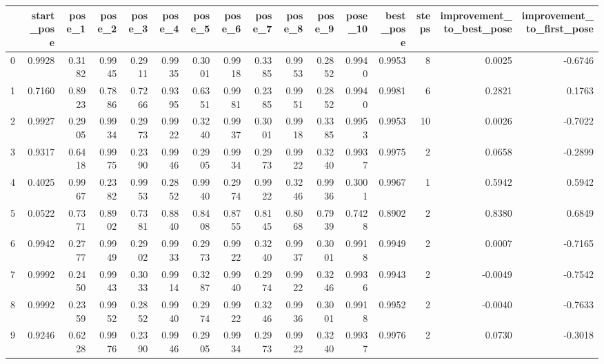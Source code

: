 \begin{tabular}{lrrrrrrrrrrrrrrr}
\toprule
{} &  start\_pose &  pose\_1 &  pose\_2 &  pose\_3 &  pose\_4 &  pose\_5 &  pose\_6 &  pose\_7 &  pose\_8 &  pose\_9 &  pose\_10 &  best\_pose &  steps &  improvement\_to\_best\_pose &  improvement\_to\_first\_pose \\
\midrule
0   &      0.9928 &  0.3182 &  0.9945 &  0.2911 &  0.9935 &  0.3001 &  0.9918 &  0.3385 &  0.9953 &  0.2852 &   0.9940 &     0.9953 &      8 &                    0.0025 &                    -0.6746 \\
1   &      0.7160 &  0.8923 &  0.7886 &  0.7266 &  0.9395 &  0.6351 &  0.9981 &  0.2385 &  0.9951 &  0.2852 &   0.9940 &     0.9981 &      6 &                    0.2821 &                     0.1763 \\
2   &      0.9927 &  0.2905 &  0.9934 &  0.2973 &  0.9922 &  0.3240 &  0.9937 &  0.3001 &  0.9918 &  0.3385 &   0.9953 &     0.9953 &     10 &                    0.0026 &                    -0.7022 \\
3   &      0.9317 &  0.6418 &  0.9975 &  0.2390 &  0.9946 &  0.2905 &  0.9934 &  0.2973 &  0.9922 &  0.3240 &   0.9937 &     0.9975 &      2 &                    0.0658 &                    -0.2899 \\
4   &      0.4025 &  0.9967 &  0.2382 &  0.9953 &  0.2852 &  0.9940 &  0.2974 &  0.9922 &  0.3246 &  0.9936 &   0.3001 &     0.9967 &      1 &                    0.5942 &                     0.5942 \\
5   &      0.0522 &  0.7371 &  0.8902 &  0.7381 &  0.8840 &  0.8408 &  0.8755 &  0.8145 &  0.8068 &  0.7939 &   0.7428 &     0.8902 &      2 &                    0.8380 &                     0.6849 \\
6   &      0.9942 &  0.2777 &  0.9949 &  0.2902 &  0.9933 &  0.2973 &  0.9922 &  0.3240 &  0.9937 &  0.3001 &   0.9918 &     0.9949 &      2 &                    0.0007 &                    -0.7165 \\
7   &      0.9992 &  0.2450 &  0.9943 &  0.3033 &  0.9914 &  0.3287 &  0.9940 &  0.2974 &  0.9922 &  0.3246 &   0.9936 &     0.9943 &      2 &                   -0.0049 &                    -0.7542 \\
8   &      0.9992 &  0.2359 &  0.9952 &  0.2852 &  0.9940 &  0.2974 &  0.9922 &  0.3246 &  0.9936 &  0.3001 &   0.9918 &     0.9952 &      2 &                   -0.0040 &                    -0.7633 \\
9   &      0.9246 &  0.6228 &  0.9976 &  0.2390 &  0.9946 &  0.2905 &  0.9934 &  0.2973 &  0.9922 &  0.3240 &   0.9937 &     0.9976 &      2 &                    0.0730 &                    -0.3018 \\

\end{tabular}
